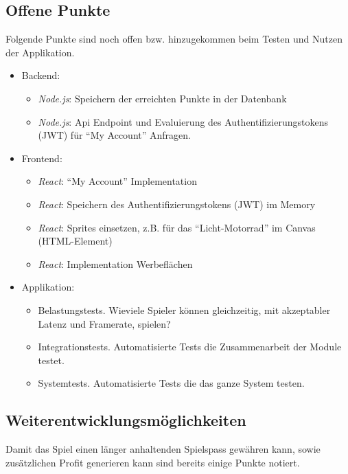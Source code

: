 \documentclass[11pt,ngerman]{article}
\newcommand{\quotes}[1]{``#1''}
\begin{document}
    \subsection{Offene Punkte}
    Folgende Punkte sind noch offen bzw. hinzugekommen beim Testen und Nutzen der Applikation.

	\begin{itemize}
        \item Backend:
            \begin{itemize}
                \item \textit{Node.js}: Speichern der erreichten Punkte in der Datenbank
                \item \textit{Node.js}:  Api Endpoint und Evaluierung des Authentifizierungstokens (JWT) für \quotes{My Account} Anfragen.
            \end{itemize}
       \item Frontend:
            \begin{itemize}
                \item \textit{React}: \quotes{My Account} Implementation
                \item \textit{React}: Speichern des Authentifizierungstokens (JWT) im Memory
                \item \textit{React}: \Glspl{Sprite} einsetzen, z.B. für das \quotes{Licht-Motorrad} im \Gls{Canvas} (HTML-Element)
                 \item \textit{React}: Implementation Werbeflächen
            \end{itemize}
        \item Applikation:
            \begin{itemize}
                \item Belastungstests. Wieviele Spieler können gleichzeitig, mit akzeptabler Latenz und Framerate, spielen?
                \item Integrationstests. Automatisierte Tests die Zusammenarbeit der Module testet.
                \item Systemtests. Automatisierte Tests die das ganze System testen.
            \end{itemize}
	\end{itemize}

    \subsection{Weiterentwicklungsmöglichkeiten}
    Damit das Spiel einen länger anhaltenden Spielspass gewähren kann, sowie zusätzlichen Profit generieren kann sind bereits einige Punkte notiert.
\end{document}
